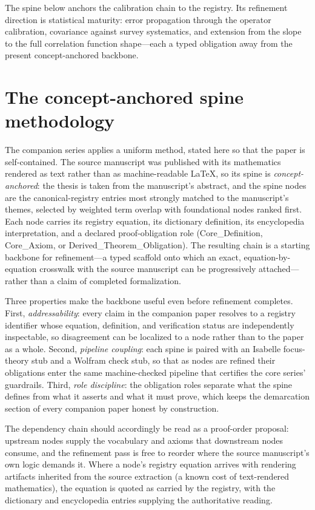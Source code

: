 \documentclass[11pt]{article}
\theoremstyle{remark}
\begin{document}
The spine below anchors the calibration chain to the registry. Its refinement direction is statistical maturity: error propagation through the operator calibration, covariance against survey systematics, and extension from the slope to the full correlation function shape---each a typed obligation away from the present concept-anchored backbone.

\section{The concept-anchored spine methodology}
\label{sec:method}

The companion series applies a uniform method, stated here so that the paper is self-contained. The source manuscript was published with its mathematics rendered as text rather than as machine-readable LaTeX, so its spine is \emph{concept-anchored}: the thesis is taken from the manuscript's abstract, and the spine nodes are the canonical-registry entries most strongly matched to the manuscript's themes, selected by weighted term overlap with foundational nodes ranked first. Each node carries its registry equation, its dictionary definition, its encyclopedia interpretation, and a declared proof-obligation role (Core\_Definition, Core\_Axiom, or Derived\_Theorem\_Obligation). The resulting chain is a starting backbone for refinement---a typed scaffold onto which an exact, equation-by-equation crosswalk with the source manuscript can be progressively attached---rather than a claim of completed formalization.

Three properties make the backbone useful even before refinement completes. First, \emph{addressability}: every claim in the companion paper resolves to a registry identifier whose equation, definition, and verification status are independently inspectable, so disagreement can be localized to a node rather than to the paper as a whole. Second, \emph{pipeline coupling}: each spine is paired with an Isabelle focus-theory stub and a Wolfram check stub, so that as nodes are refined their obligations enter the same machine-checked pipeline that certifies the core series' guardrails. Third, \emph{role discipline}: the obligation roles separate what the spine defines from what it asserts and what it must prove, which keeps the demarcation section of every companion paper honest by construction.

The dependency chain should accordingly be read as a proof-order proposal: upstream nodes supply the vocabulary and axioms that downstream nodes consume, and the refinement pass is free to reorder where the source manuscript's own logic demands it. Where a node's registry equation arrives with rendering artifacts inherited from the source extraction (a known cost of text-rendered mathematics), the equation is quoted as carried by the registry, with the dictionary and encyclopedia entries supplying the authoritative reading.
\end{document}
